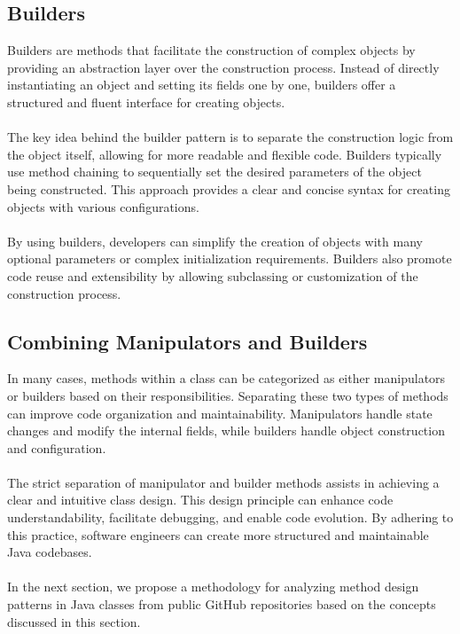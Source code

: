 \documentclass[draft]{article}
\begin{document}
\subsection{Builders}
Builders are methods that facilitate the construction of complex objects by providing an abstraction layer over the construction process. Instead of directly instantiating an object and setting its fields one by one, builders offer a structured and fluent interface for creating objects.\\
~\\
The key idea behind the builder pattern is to separate the construction logic from the object itself, allowing for more readable and flexible code. Builders typically use method chaining to sequentially set the desired parameters of the object being constructed. This approach provides a clear and concise syntax for creating objects with various configurations.\\
~\\
By using builders, developers can simplify the creation of objects with many optional parameters or complex initialization requirements. Builders also promote code reuse and extensibility by allowing subclassing or customization of the construction process.
\subsection{Combining Manipulators and Builders}
In many cases, methods within a class can be categorized as either manipulators or builders based on their responsibilities. Separating these two types of methods can improve code organization and maintainability. Manipulators handle state changes and modify the internal fields, while builders handle object construction and configuration.\\
~\\
The strict separation of manipulator and builder methods assists in achieving a clear and intuitive class design. This design principle can enhance code understandability, facilitate debugging, and enable code evolution. By adhering to this practice, software engineers can create more structured and maintainable Java codebases.\\
~\\
In the next section, we propose a methodology for analyzing method design patterns in Java classes from public GitHub repositories based on the concepts discussed in this section.\\
~\\
\end{document}

